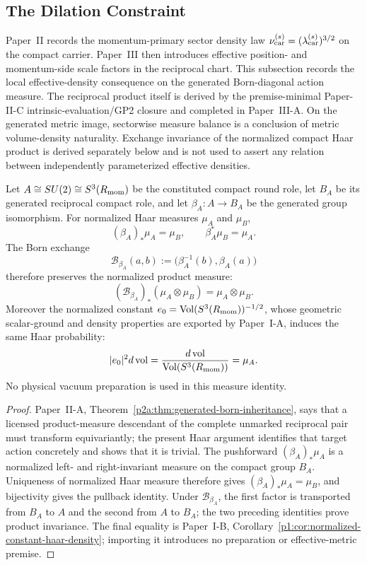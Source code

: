 \documentclass[12pt,a4paper]{article}
\begin{document}
\subsection{The Dilation Constraint}
\label{p3:sec:dilation-constraint}

Paper~II records the momentum-primary sector density law
\(\nu_{\rm car}^{(s)}=(\lambda_{\rm car}^{(s)})^{3/2}\) on the compact
carrier.  Paper~III then introduces effective position- and momentum-side
scale factors in the reciprocal chart.  This subsection records the local
effective-density consequence on the generated Born-diagonal action measure.
The reciprocal product itself is derived by the premise-minimal Paper-II-C
intrinsic-evaluation/GP2 closure and completed in Paper~III-A.  On the
generated metric image, sectorwise measure balance is a conclusion of metric
volume-density naturality.  Exchange invariance of the normalized compact
Haar product is derived separately below and is not used to assert any
relation between independently parameterized effective densities.

\begin{theorem}
\label{p3e:thm:compact-haar-born-balance}
Let \(A\cong SU(2)\cong S^3(R_{\mathrm{mom}})\) be the constituted compact round role,
let \(B_A\) be its generated reciprocal compact role, and let
\(\beta_A:A\to B_A\) be the generated group isomorphism.  For normalized
Haar measures \(\mu_A\) and \(\mu_B\),
\[
 (\beta_A)_*\mu_A=\mu_B,
 \qquad
 \beta_A^*\mu_B=\mu_A.
\]
The Born exchange
\[
 \mathcal B_{\beta_A}(a,b)
 :=\bigl(\beta_A^{-1}(b),\beta_A(a)\bigr)
\]
therefore preserves the normalized product measure:
\[
 \boxed{
 (\mathcal B_{\beta_A})_*(\mu_A\otimes\mu_B)
 =\mu_A\otimes\mu_B.}
\]
Moreover the normalized constant
\(e_0=\operatorname{Vol}(S^3(R_{\mathrm{mom}}))^{-1/2}\), whose geometric scalar-ground
and density properties are exported by Paper~I-A, induces the same Haar
probability:
\[
 |e_0|^2d\operatorname{vol}
 =\frac{d\operatorname{vol}}
        {\operatorname{Vol}(S^3(R_{\mathrm{mom}}))}
 =\mu_A.
\]
No physical vacuum preparation is used in this measure identity.
\end{theorem}

\begin{proof}
Paper~II-A, Theorem~\ref{p2a:thm:generated-born-inheritance}, says that a
licensed product-measure descendant of the complete unmarked reciprocal pair
must transform equivariantly; the present Haar argument identifies that target
action concretely and shows that it is trivial.  The pushforward
\((\beta_A)_*\mu_A\) is a normalized left- and right-invariant measure on the
compact group \(B_A\).  Uniqueness of normalized Haar measure
therefore gives \((\beta_A)_*\mu_A=\mu_B\), and bijectivity gives the pullback
identity.  Under \(\mathcal B_{\beta_A}\), the first factor is transported
from \(B_A\) to \(A\) and the second from \(A\) to \(B_A\); the two preceding
identities prove product invariance.  The final equality is Paper~I-B,
Corollary~\ref{p1:cor:normalized-constant-haar-density}; importing it introduces
no preparation or effective-metric premise.
\end{proof}
\end{document}
